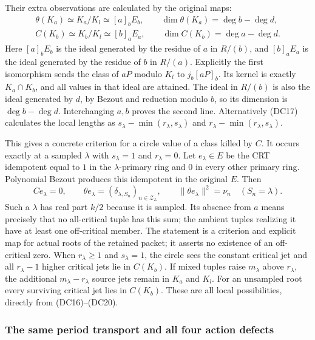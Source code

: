 Their extra observations are calculated by the original maps:
\[
 \begin{gathered}
 \theta(K_a)\simeq K_a/K_l\simeq [a]_b E_b,\qquad
 \dim\theta(K_a)=\deg b-\deg d,\\
 C(K_b)\simeq K_b/K_l\simeq [b]_a E_a,\qquad
 \dim C(K_b)=\deg a-\deg d .
 \end{gathered}
 \tag{DC20}
\]
Here $[a]_b E_b$ is the ideal generated by the residue of $a$
in $R/(b)$, and $[b]_a E_a$ is the ideal generated by the residue
of $b$ in $R/(a)$.  Explicitly the first
isomorphism sends the class of $aP$ modulo $K_l$ to
$j_b[aP]_b$.  Its kernel is exactly $K_a\cap K_b$, and all
values in that ideal are attained.  The ideal in $R/(b)$ is
also the ideal generated by $d$, by Bezout and reduction modulo
$b$, so its dimension is $\deg b-\deg d$.  Interchanging $a,b$
proves the second line.  Alternatively (DC17) calculates the
local lengths as
$s_\lambda-\min(r_\lambda,s_\lambda)$ and
$r_\lambda-\min(r_\lambda,s_\lambda)$.

This gives a concrete criterion for a circle value of a class killed
by $C$.  It occurs exactly at a sampled $\lambda$ with
$s_\lambda=1$ and $r_\lambda=0$.
Let $e_\lambda\in E$ be the CRT idempotent equal to $1$ in the
$\lambda$-primary ring and $0$ in every other primary ring.
Polynomial Bezout produces this idempotent in the original $E$.
Then
\[
 Ce_\lambda=0,\qquad
 \theta e_\lambda=(\delta_{\lambda,S_n})_{n\in\mathcal Z_L},
 \qquad
 \|\theta e_\lambda\|^2=\nu_n\quad(S_n=\lambda).
 \tag{DC21}
\]
Such a $\lambda$ has real part $k/2$ because it is sampled.
Its absence from $a$ means precisely that no all-critical tuple
has this sum; the ambient tuples realizing it have at least one
off-critical member.  The statement is a criterion and explicit
map for actual roots of the retained packet; it asserts no
existence of an off-critical zero.  When $r_\lambda\ge1$ and
$s_\lambda=1$, the circle sees the constant critical jet and all
$r_\lambda-1$ higher critical jets lie in $C(K_b)$.  If mixed
tuples raise $m_\lambda$ above $r_\lambda$, the additional
$m_\lambda-r_\lambda$ source jets remain in $K_a$ and $K_l$.
For an unsampled root every surviving critical jet lies in
$C(K_b)$.  These are all local possibilities, directly from
(DC16)--(DC20).

\subsubsection{The same period transport and all four action defects}

